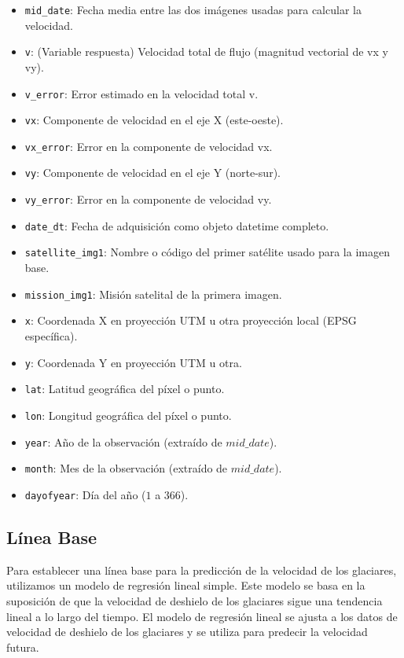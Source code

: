 \documentclass[sigconf,authordraft,language=spanish]{acmart}
\begin{document}
\begin{itemize}
    \item \verb|mid_date|: Fecha media entre las dos imágenes usadas para calcular la velocidad.
    \item \verb|v|: (Variable respuesta) Velocidad total de flujo (magnitud vectorial de vx y vy).
    \item \verb|v_error|:	Error estimado en la velocidad total v.
    \item \verb|vx|:	Componente de velocidad en el eje X (este-oeste).
    \item \verb|vx_error|:	Error en la componente de velocidad vx.
    \item \verb|vy|:	Componente de velocidad en el eje Y (norte-sur).
    \item \verb|vy_error|:	Error en la componente de velocidad vy.
    \item \verb|date_dt|:	Fecha de adquisición como objeto datetime completo.
    \item \verb|satellite_img1|:	Nombre o código del primer satélite usado para la imagen base.
    \item \verb|mission_img1|:	Misión satelital de la primera imagen.
    \item \verb|x|:	Coordenada X en proyección UTM u otra proyección local (EPSG específica).
    \item \verb|y|:	Coordenada Y en proyección UTM u otra.
    \item \verb|lat|:	Latitud geográfica del píxel o punto.
    \item \verb|lon|:	Longitud geográfica del píxel o punto.
    \item \verb|year|:	Año de la observación (extraído de $mid\_date$).
    \item \verb|month|:	Mes de la observación (extraído de $mid\_date$).
    \item \verb|dayofyear|:	Día del año ($1$ a $366$).

\end{itemize}

\subsection{Línea Base}

Para establecer una línea base para la predicción de la velocidad de los glaciares, utilizamos un modelo de regresión lineal simple.
Este modelo se basa en la suposición de que la velocidad de deshielo de los glaciares sigue una tendencia lineal a lo largo del tiempo.
El modelo de regresión lineal se ajusta a los datos de velocidad de deshielo de los glaciares y se utiliza para predecir la velocidad futura.
\end{document}
